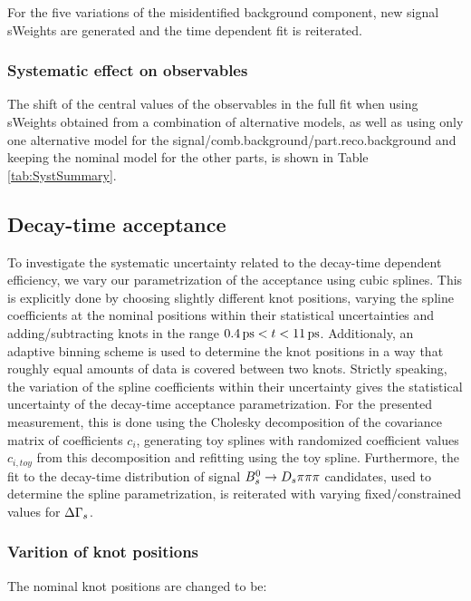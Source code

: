 For the five variations of the misidentified background component, new signal sWeights are generated and the time dependent fit is reiterated. 


\subsubsection{Systematic effect on observables}

The shift of the central values of the observables in the full fit when using sWeights obtained from a combination of alternative models, 
as well as using only one alternative model for the signal/comb.background/part.reco.background and keeping the nominal model for the other parts,
is shown in Table \ref{tab:SystSummary}. 



\subsection{Decay-time acceptance}
\label{subsec:SystTime}

To investigate the systematic uncertainty related to the decay-time dependent efficiency, we vary our parametrization of the acceptance using cubic splines.
This is explicitly done by choosing slightly different knot positions, 
varying the spline coefficients at the nominal positions within their statistical uncertainties and adding/subtracting knots in the range $0.4{\mathrm{ \,ps}} < t < 11{\mathrm{ \,ps}}$.
Additionaly, an adaptive binning scheme is used to determine the knot positions in a way that roughly equal amounts of data is covered between two knots.
Strictly speaking, the variation of the spline coefficients within their uncertainty gives the statistical uncertainty of the decay-time acceptance parametrization.
For the presented measurement, this is done using the Cholesky decomposition  \cite{Golub:1996:MC:248979} of the covariance matrix of coefficients $c_{i}$, 
generating toy splines with randomized coefficient values $c_{i,toy}$ from this decomposition and refitting using the toy spline.  
Furthermore, the fit to the decay-time distribution of signal ${{B}^0_{s}}\rightarrow{\ensuremath{{D}_{s}}}{\ensuremath{\pi}}{\ensuremath{\pi}}{\ensuremath{\pi}}$ candidates, used to determine the spline parametrization, is reiterated with varying fixed/constrained values for ${\Delta\Gamma_{{s}}}$.


\subsubsection{Varition of knot positions}
The nominal knot positions are changed to be:


